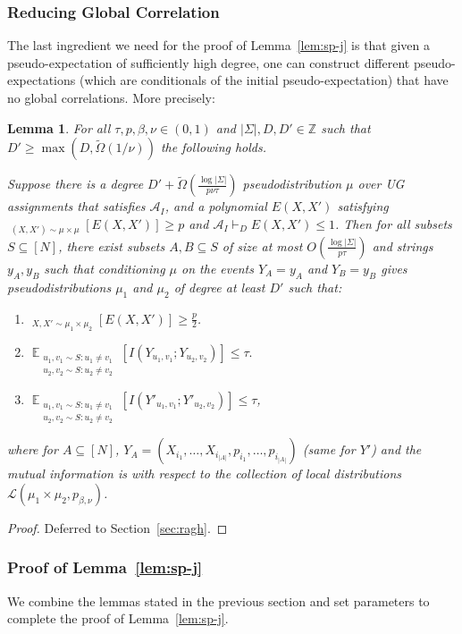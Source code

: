 \documentclass[11pt]{article}
\DeclareMathOperator*{\E}{\mathbb{E}}
\DeclareMathOperator*{\pE}{\widetilde{\mathbb{E}}}
\def \Z {\mathbb{Z}}
\def \cA {\mathcal{A}}
\def \cL {\mathcal{L}}
\newtheorem{lemma}[theorem]{Lemma}
\theoremstyle{definition}
\begin{document}
\subsubsection{Reducing Global Correlation}
The last ingredient we need for the proof of Lemma~\ref{lem:sp-j} is 
that given a pseudo-expectation of sufficiently high degree, one can 
construct different pseudo-expectations (which are conditionals 
of the initial pseudo-expectation) that have no global correlations.
More precisely:
\begin{lemma}\label{lem:ragh-tan-appln}
For all $\tau,p,\beta,\nu \in (0,1)$ and $|\Sigma|, D, D' \in \Z$ 
such that $D' \geq \max(D,\widetilde{\Omega}(1/\nu))$ the following holds.

Suppose there is a degree $D' + \widetilde{\Omega}(\frac{\log |\Sigma|}{p \nu \tau})$ pseudodistribution $\mu$ over UG assignments that satisfies $\cA_I$, and a polynomial $E(X,X')$ satisfying $\pE_{(X,X') \sim \mu \times \mu}[E(X,X')] \geq p$ and $\cA_I \vdash_D E(X,X') \leq 1$. Then for all subsets $S \subseteq [N]$, there exist subsets $A, B \subseteq S$ of size at most $O(\frac{\log|\Sigma|}{p\tau})$ and strings $y_A, y_B$ such that conditioning $\mu$ on the events $Y_A = y_A$ and $Y_B = y_B$ gives pseudodistributions $\mu_1$ and $\mu_2$ of degree at least $D'$ such that: 
\begin{enumerate}
\item $\pE_{X,X'\sim \mu_1\times\mu_2}[E(X,X')] \geq \frac{p}{2}$.
\item $\E_{\substack{u_1,v_1 \sim S: u_1 \neq v_1\\ u_2,v_2 \sim S: u_2 \neq v_2}}[I(Y_{u_1,v_1};Y_{u_2,v_2})] \leq \tau.$
\item $\E_{\substack{u_1,v_1 \sim S: u_1 \neq v_1\\ u_2,v_2 \sim S: u_2 \neq v_2}}[I(Y'_{u_1,v_1};Y'_{u_2,v_2})] \leq \tau$,
\end{enumerate}
where for $A \subseteq [N]$, $Y_{A} = (X_{i_1},\ldots, X_{i_{|A|}},p_{i_1},\ldots, p_{i_{|A|}})$ (same for $Y'$) and the mutual information is with respect to the collection of local distributions $\cL(\mu_1 \times \mu_2,p_{\beta,\nu})$.
\end{lemma}
\begin{proof}
Deferred to Section~\ref{sec:ragh}.
\end{proof}

\subsubsection{Proof of Lemma~\ref{lem:sp-j}}
We combine the lemmas stated in the previous section and set parameters to complete the proof of Lemma~\ref{lem:sp-j}.
\end{document}
